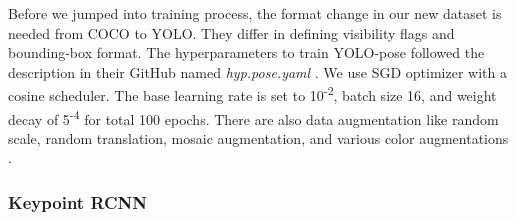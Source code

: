 Before we jumped into training process, the format change in our new dataset is needed from COCO to YOLO. They differ in defining visibility flags and bounding-box format.
The hyperparameters to train YOLO-pose followed the description in their GitHub named \emph{hyp.pose.yaml} .
We use SGD optimizer with a cosine scheduler. The base learning rate is set to 10\textsuperscript{-2}, batch size 16,
and weight decay of 5\textsuperscript{-4} for total 100 epochs. There are also data augmentation like random scale,
random translation, mosaic augmentation, and various color augmentations \citep{maji2022yolopose}.


\subsubsection{Keypoint RCNN}
\label{subsubsec:training-rcnn}


